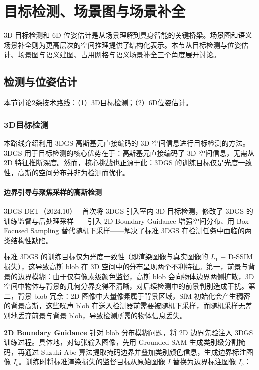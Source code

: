 \section{目标检测、场景图与场景补全}
\label{sec:10_2}

3D 目标检测和 6D 位姿估计是从场景理解到具身智能的关键桥梁。场景图和语义场景补全则为更高层次的空间推理提供了结构化表示。本节从目标检测与位姿估计、场景图与语义建图、占用网格与语义场景补全三个角度展开讨论。

\subsection{检测与位姿估计}
\label{ss:10_4}

本节讨论2条技术路线：（1）3D目标检测；（2）6D位姿估计。

\subsubsection{3D目标检测}

本路线介绍利用 3DGS 高斯基元直接编码的 3D 空间信息进行目标检测的方法。3DGS 用于目标检测的核心优势在于：高斯基元直接编码了 3D 空间信息，无需从 2D 特征推断深度。然而，核心挑战也正源于此：3DGS 的训练目标仅是光度一致性，高斯的空间分布并非为检测而优化。

\paragraph{边界引导与聚焦采样的高斯检测} 3DGS-DET（2024.10）~\cite{2410_01647} 首次将 3DGS 引入室内 3D 目标检测，修改了 3DGS 的训练监督与后处理采样——引入 2D Boundary Guidance 增强空间分布、用 Box-Focused Sampling 替代随机下采样——解决了标准 3DGS 在检测任务中面临的两类结构性缺陷。

标准 3DGS 的训练目标仅为光度一致性（即渲染图像与真实图像的 $L_1$ + D-SSIM 损失），这导致高斯 blob 在 3D 空间中的分布呈现两个不利特征。第一，前景与背景的边界模糊：由于仅有像素级颜色监督，高斯 blob 会向物体边界两侧扩散，3D 空间中物体与背景的几何分界变得不清晰，对后续检测中的前景判别造成干扰。第二，背景 blob 冗余：2D 图像中大量像素属于背景区域，SfM 初始化会产生稠密的背景高斯，这些噪声 blob 在送入检测器前需要被随机下采样，而随机采样无差别地丢弃前景与背景 blob，导致检测所需的物体信息丢失。

\textbf{2D Boundary Guidance} 针对 blob 分布模糊问题，将 2D 边界先验注入 3DGS 训练过程。具体地，对每张输入图像，先用 Grounded SAM 生成类别级分割掩码，再通过 Suzuki-Abe 算法提取掩码边界并叠加类别颜色信息，生成边界标注图像 $I_b$。训练时将标准渲染损失的监督目标从原始图像 $I$ 替换为边界标注图像 $I_b$：

